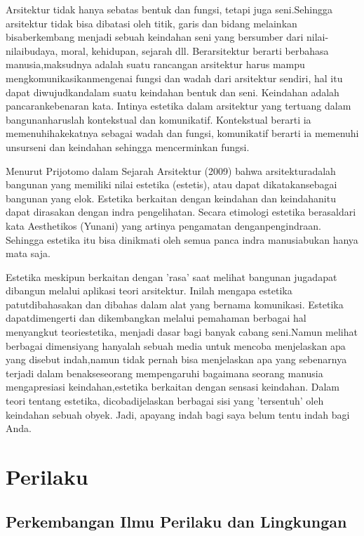 \documentclass[../manperil.tex]{subfiles}
\begin{document}
Arsitektur tidak hanya sebatas bentuk dan fungsi, tetapi juga seni.Sehingga arsitektur tidak bisa dibatasi oleh titik, garis dan bidang melainkan bisaberkembang menjadi sebuah keindahan seni yang bersumber dari nilai-nilaibudaya, moral, kehidupan, sejarah dll. Berarsitektur berarti berbahasa manusia,maksudnya adalah suatu rancangan arsitektur harus mampu mengkomunikasikanmengenai fungsi dan wadah dari arsitektur sendiri, hal itu dapat diwujudkandalam suatu keindahan bentuk dan seni. Keindahan adalah pancarankebenaran kata. Intinya estetika dalam arsitektur yang tertuang dalam bangunanharuslah kontekstual dan komunikatif. Kontekstual berarti ia memenuhihakekatnya sebagai wadah dan fungsi, komunikatif berarti ia memenuhi unsurseni dan keindahan sehingga mencerminkan fungsi.

Menurut Prijotomo dalam Sejarah Arsitektur (2009) bahwa arsitekturadalah bangunan yang memiliki nilai estetika (estetis), atau dapat dikatakansebagai bangunan yang elok. Estetika berkaitan dengan keindahan dan keindahanitu dapat dirasakan dengan indra pengelihatan. Secara etimologi estetika berasaldari kata Aesthetikos (Yunani) yang artinya pengamatan denganpengindraan. Sehingga estetika itu bisa dinikmati oleh semua panca indra manusiabukan hanya mata saja.

Estetika meskipun berkaitan dengan 'rasa' saat melihat bangunan jugadapat dibangun melalui aplikasi teori arsitektur. Inilah mengapa estetika patutdibahasakan dan dibahas dalam alat yang bernama komunikasi. Estetika dapatdimengerti dan dikembangkan melalui pemahaman berbagai hal menyangkut teoriestetika, menjadi dasar bagi banyak cabang seni.Namun melihat berbagai dimensiyang hanyalah sebuah media untuk mencoba menjelaskan apa yang disebut indah,namun tidak pernah bisa menjelaskan apa yang sebenarnya terjadi dalam benakseseorang mempengaruhi bagaimana seorang manusia mengapresiasi keindahan,estetika berkaitan dengan sensasi keindahan. Dalam teori tentang estetika, dicobadijelaskan berbagai sisi yang 'tersentuh' oleh keindahan sebuah obyek. Jadi, apayang indah bagi saya belum tentu indah bagi Anda.


\section{Perilaku}%
\label{sec:Perilaku}


\subsection{Perkembangan Ilmu Perilaku dan Lingkungan}%
\label{sub:Perkembangan Ilmu Perilaku dan Lingkungan}
\end{document}
